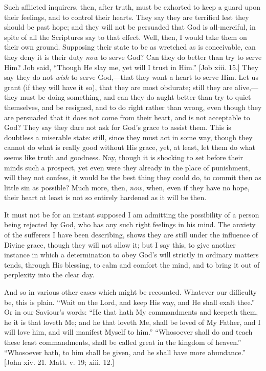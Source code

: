 Such afflicted inquirers, then, after truth, must be
exhorted to keep a guard upon their feelings, and to
control their hearts. They say they are terrified lest
they should be past hope; and they will not be persuaded
that God is all-merciful, in spite of all the Scriptures
say to that effect. Well, then, I would take them on
their own ground. Supposing their state to be as wretched
as is conceivable, can they deny it is their duty \emph{now}
to serve God? Can they do better than try to serve Him?
Job said, ``Though He slay me, yet will I trust in
Him.'' [Job xiii. 15.] They say they do not \emph{wish}
to serve God,—that they want a heart to serve Him.
Let us grant (if they will have it so), that they are
most obdurate; still they are alive,—they must be
doing something, and can they do aught better than try to
quiet themselves, and be resigned, and to do right rather
than wrong, even though they are persuaded that it does
not come from their heart, and is not acceptable to God?
They say they dare not ask for God's grace to assist
them. This is doubtless a miserable state: still, since
they must act in some way, though they cannot do what is
really good without His grace, yet, at least, let them do
what seems like truth and goodness. Nay, though it is
shocking to set before their minds such a prospect, yet
even were they already in the place of punishment, will
they not confess, it would be the best thing they could
do, to commit then as little sin as possible? Much more,
then, \emph{now}, when, even if they have no hope, their
heart at least is not so entirely hardened as it will be
then.

It must not be for an instant supposed I am admitting
the possibility of a person being rejected by God, who
has any such right feelings in his mind. The anxiety of
the sufferers I have been describing, shows they are
still under the influence of Divine grace, though they
will not allow it; but I say this, to give another
instance in which a determination to obey God's will
strictly in ordinary matters tends, through His blessing,
to calm and comfort the mind, and to bring it out of
perplexity into the clear day.

And so in various other cases which might be
recounted. Whatever our difficulty be, this is plain. ``Wait on the Lord, and keep His way, and He shall
exalt thee.'' Or in our Saviour's words: ``He
that hath My commandments and keepeth them, he it is that
loveth Me; and he that loveth Me, shall be loved of My
Father, and I will love him, and will manifest Myself to
him.'' ``Whosoever shall do and teach these least
commandments, shall be called great in the kingdom of
heaven.'' ``Whosoever hath, to him shall be
given, and he shall have more abundance.'' [John xiv.
21. Matt. v. 19; xiii. 12.]

